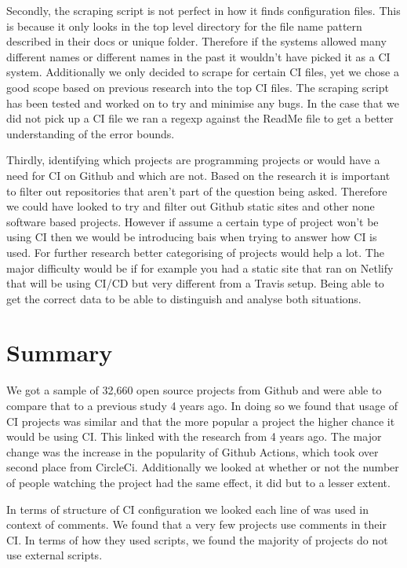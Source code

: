 \documentclass[10pt,conference]{IEEEtran}
\begin{document}
Secondly, the scraping script is not perfect in how it finds configuration files. This is because it only looks in the top level directory for the file name pattern described in their docs or unique folder. Therefore if the systems allowed many different names or different names in the past it wouldn't have picked it as a CI system. Additionally we only decided to scrape for certain CI files, yet we chose a good scope based on previous research into the top CI files. The scraping script has been tested and worked on to try and minimise any bugs. In the case that we did not pick up a CI file we ran a regexp against the ReadMe file to get a better understanding of the error bounds.

Thirdly, identifying which projects are programming projects or would have a need for CI on Github and which are not. Based on the research \cite{Kalliamvakou2014} it is important to filter out repositories that aren't part of the question being asked. Therefore we could have looked to try and filter out Github static sites and other none software based projects. However if assume a certain type of project won't be using CI then we would be introducing bais when trying to answer how CI is used. For further research better categorising of projects would help a lot. The major difficulty would be if for example you had a static site that ran on Netlify that will be using CI/CD but very different from a Travis setup. Being able to get the correct data to be able to distinguish and analyse both situations. 


\pagebreak



\section{Summary}

We got a sample of 32,660 open source projects from Github and were able to compare that to a previous study 4 years ago. In doing so we found that usage of CI projects was similar and that the more popular a project the higher chance it would be using CI. This linked with the research from 4 years ago. The major change was the increase in the popularity of Github Actions, which took over second place from CircleCi. Additionally we looked at whether or not the number of people watching the project had the same effect, it did but to a lesser extent.


In terms of structure of CI configuration we looked each line of was used in context of comments. We found that a very few projects use comments in their CI. In terms of how they used scripts, we found the majority of projects do not use external scripts. 
\end{document}
